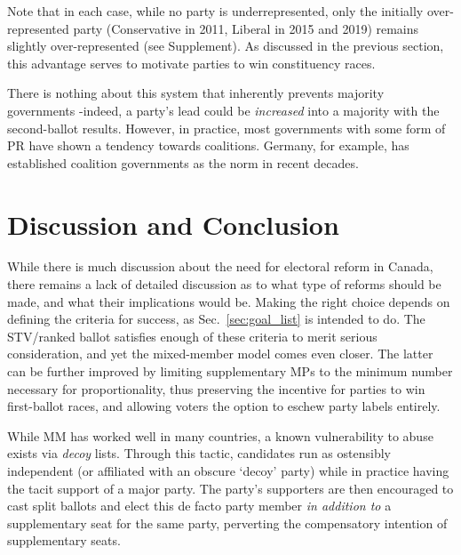 Note that in each case, while no party is underrepresented, only the initially over-represented party (Conservative in 2011, Liberal in 2015 and 2019) remains slightly over-represented (see Supplement).
As discussed in the previous section, this advantage serves to motivate parties to win constituency races.

There is nothing about this system that inherently prevents majority governments \--indeed, a party's lead could be \emph{increased} into a majority with the second-ballot results. However, in practice, most governments with some form of PR have shown a tendency towards coalitions. Germany, for example, has established coalition governments as the norm in recent decades.

\section{Discussion and Conclusion}

While there is much discussion about the need for electoral reform in Canada, there remains a lack of detailed discussion as to what type of reforms should be made, and what their implications would be.
Making the right choice depends on defining the criteria for success, as Sec.~\ref{sec:goal_list} is intended to do.
The STV/ranked ballot satisfies enough of these criteria to merit serious consideration, and yet the mixed-member model comes even closer.
The latter can be further improved by limiting supplementary MPs to the minimum number necessary for proportionality, thus preserving the incentive for parties to win first-ballot races, and allowing voters the option to eschew party labels entirely.

%
While MM has worked well in many countries, a known vulnerability to abuse exists via \emph{decoy} lists.
Through this tactic, candidates run as ostensibly independent (or affiliated with an obscure `decoy' party) while in practice having the tacit support of a major party.
The party's supporters are then encouraged to cast split ballots and elect this de facto party member \emph{in addition to} a supplementary seat for the same party, perverting the compensatory intention of supplementary seats.

